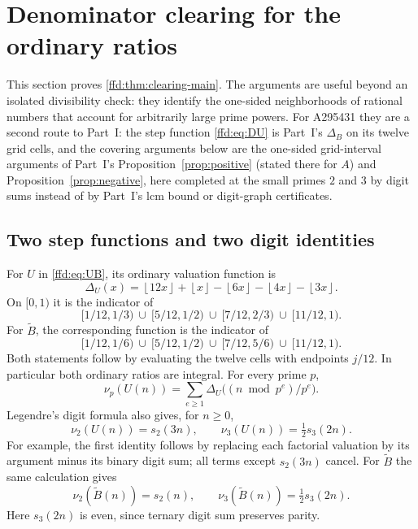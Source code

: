 \documentclass[11pt]{article}
\theoremstyle{definition}
\theoremstyle{remark}
\newcommand{\floor}[1]{\left\lfloor #1\right\rfloor}
\newcommand{\nup}{\nu_p}
\newcommand{\tB}{\widetilde B}
\begin{document}
\section{Denominator clearing for the ordinary ratios}\label{ffd:sec:denominators}
This section proves \cref{ffd:thm:clearing-main}. The arguments are useful beyond
an isolated divisibility check: they identify the one-sided neighborhoods of
rational numbers that account for arbitrarily large prime powers.
For A295431 they are a second route to Part~I: the step function
\eqref{ffd:eq:DU} is Part~I's $\Delta_B$ on its twelve grid cells, and the
covering arguments below are the one-sided grid-interval arguments of
Part~I's Proposition~\ref{prop:positive} (stated there for $A$) and
Proposition~\ref{prop:negative}, here completed at the small
primes $2$ and $3$ by digit sums instead of by Part~I's lcm bound or
digit-graph certificates.

\subsection{Two step functions and two digit identities}
For $U$ in \eqref{ffd:eq:UB}, its ordinary valuation function is
\begin{equation}
 \Delta_U(x)=\floor{12x}+\floor{x}-\floor{6x}-\floor{4x}-\floor{3x}.
\end{equation}
On $[0,1)$ it is the indicator of
\begin{equation}
 [1/12,1/3)\ \cup\ [5/12,1/2)\ \cup\ [7/12,2/3)\ \cup\ [11/12,1).
 \label{ffd:eq:DU}
\end{equation}
For $\tB$, the corresponding function is the indicator of
\begin{equation}
 [1/12,1/6)\ \cup\ [5/12,1/2)\ \cup\ [7/12,5/6)\ \cup\ [11/12,1).
 \label{ffd:eq:DB}
\end{equation}
Both statements follow by evaluating the twelve cells with endpoints $j/12$.
In particular both ordinary ratios are integral.
For every prime $p$,
\begin{equation}
 \nup(U(n))=\sum_{e\ge1}\Delta_U\bigl((n\bmod p^e)/p^e\bigr).
 \label{ffd:eq:Uval}
\end{equation}
Legendre's digit formula also gives, for $n\ge0$,
\begin{equation}
 \nu_2(U(n))=s_2(3n),\qquad
 \nu_3(U(n))=\tfrac12s_3(2n).
 \label{ffd:eq:Udigits}
\end{equation}
For example, the first identity follows by replacing each factorial valuation
by its argument minus its binary digit sum; all terms except $s_2(3n)$ cancel.
For $\tB$ the same calculation gives
\begin{equation}
 \nu_2(\tB(n))=s_2(n),\qquad \nu_3(\tB(n))=\tfrac12s_3(2n).
 \label{ffd:eq:Bdigits}
\end{equation}
Here $s_3(2n)$ is even, since ternary digit sum preserves parity.
\end{document}
